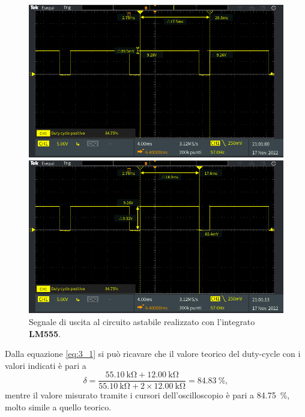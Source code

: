 \begin{figure}[tbh]
	\centering
	\begin{minipage}{.496\textwidth}
		\includegraphics[width=\linewidth]{./ImageFiles/Laboratorio 5/TEK00014.PNG}
	\end{minipage}
	\begin{minipage}{.496\textwidth}
		\includegraphics[width=\linewidth]{./ImageFiles/Laboratorio 5/TEK00015.PNG}
	\end{minipage}
	\caption{Segnale di uscita al circuito astabile realizzato con l'integrato \textbf{LM555}.}
	\label{fig:circuito_3_scope}
\end{figure}

\noindent
Dalla equazione \ref{eq:3_1} si può ricavare che il valore teorico del duty-cycle con i valori indicati è pari a
\begin{equation}
	\delta=\frac{\SI{55.10}{\kilo\ohm}+\SI{12.00}{\kilo\ohm}}{\SI{55.10}{\kilo\ohm}+2\times\SI{12.00}{\kilo\ohm}}=\SI{84.83}{\percent},
\end{equation}
mentre il valore misurato tramite i cursori dell'oscilloscopio è pari a \SI{84.75}{\percent}, molto simile a quello teorico.

